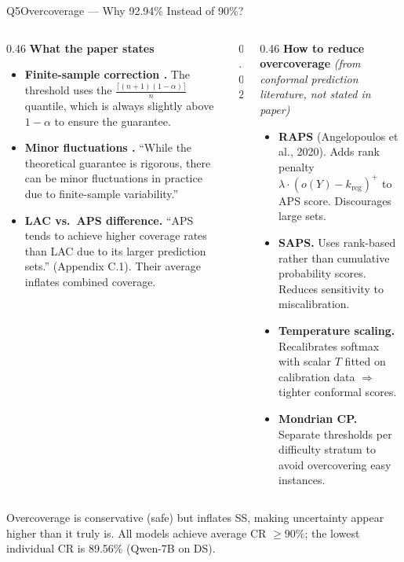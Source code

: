 \documentclass[aspectratio=169,10pt]{beamer}
\newcommand{\hruleslide}{%
  \vspace{0.15em}{\color{Rule}\hrule height 0.4pt}\vspace{0.3em}}
\begin{document}
\begin{frame}{Q5\enspace Overcoverage — Why 92.94\% Instead of 90\%?}

\begin{columns}[T]
  \begin{column}{0.46\textwidth}
    {\small\bfseries\color{darkred}What the paper states}
    \hruleslide
    \begin{itemize}\setlength\itemsep{5pt}\footnotesize
      \item \textbf{Finite-sample correction .}
        The threshold uses the $\frac{\lceil(n+1)(1-\alpha)\rceil}{n}$ quantile, which is always slightly above $1-\alpha$ to ensure the guarantee.
      \item \textbf{Minor fluctuations .}
        ``While the theoretical guarantee is rigorous, there can be minor fluctuations in practice due to finite-sample variability.''
      \item \textbf{LAC vs.\ APS difference.}
        ``APS tends to achieve higher coverage rates than LAC due to its larger prediction sets.'' (Appendix C.1). Their average inflates combined coverage.
    \end{itemize}
  \end{column}

  \begin{column}{0.02\textwidth}\color{Rule}\vrule\end{column}

  \begin{column}{0.46\textwidth}
    {\small\bfseries\color{darkred}How to reduce overcoverage}
    {\footnotesize\color{Slate}\itshape (from conformal prediction literature, not stated in paper)}
    \hruleslide
    \begin{itemize}\setlength\itemsep{5pt}\footnotesize
      \item \textbf{RAPS} (Angelopoulos et al., 2020).
        Adds rank penalty $\lambda\cdot(o(Y)-k_{\text{reg}})^+$ to APS score. Discourages large sets.
      \item \textbf{SAPS.}
        Uses rank-based rather than cumulative probability scores. Reduces sensitivity to miscalibration.
      \item \textbf{Temperature scaling.}
        Recalibrates softmax with scalar $T$ fitted on calibration data $\Rightarrow$ tighter conformal scores.
      \item \textbf{Mondrian CP.}
        Separate thresholds per difficulty stratum to avoid overcovering easy instances.
    \end{itemize}
  \end{column}
\end{columns}

\vspace{0.45em}\hruleslide
{\footnotesize\color{Slate}
  Overcoverage is conservative (safe) but inflates SS, making uncertainty appear higher than it truly is.
  All models achieve average CR $\geq90\%$; the lowest individual CR is 89.56\% (Qwen-7B on DS).}
\end{frame}
\end{document}
